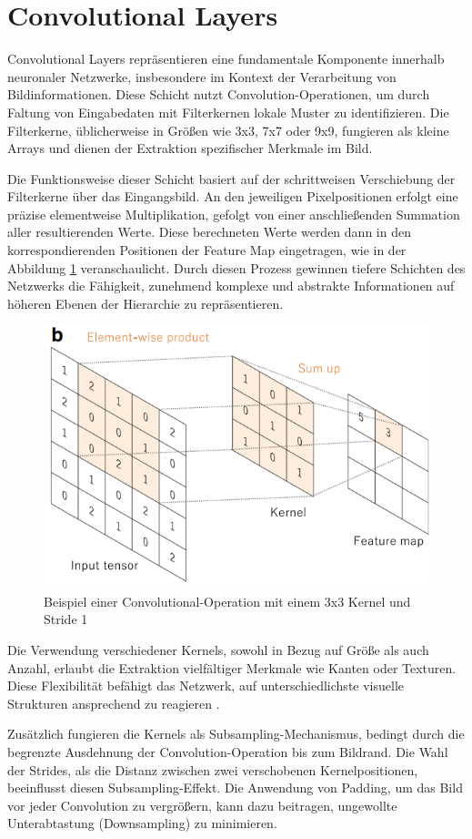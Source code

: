 \section{Convolutional Layers}
Convolutional Layers repräsentieren eine fundamentale Komponente innerhalb neuronaler Netzwerke, insbesondere im Kontext der Verarbeitung von Bildinformationen. Diese Schicht nutzt Convolution-Operationen, um durch Faltung von Eingabedaten mit Filterkernen lokale Muster zu identifizieren. Die Filterkerne, üblicherweise in Größen wie 3x3, 7x7 oder 9x9, fungieren als kleine Arrays und dienen der Extraktion spezifischer Merkmale im Bild.

Die Funktionsweise dieser Schicht basiert auf der schrittweisen Verschiebung der Filterkerne über das Eingangsbild. An den jeweiligen Pixelpositionen erfolgt eine präzise elementweise Multiplikation, gefolgt von einer anschließenden Summation aller resultierenden Werte. Diese berechneten Werte werden dann in den korrespondierenden Positionen der Feature Map eingetragen, wie in der Abbildung \ref{fig:convolutionalLayer} veranschaulicht. Durch diesen Prozess gewinnen tiefere Schichten des Netzwerks die Fähigkeit, zunehmend komplexe und abstrakte Informationen auf höheren Ebenen der Hierarchie zu repräsentieren.

\begin{figure}[ht]
	\centering
	\includegraphics[width=0.5\linewidth]{./images/convolutionalLayer.png}
	\caption{Beispiel einer Convolutional-Operation mit einem 3x3 Kernel und Stride 1\cite{Yamashita.2018}}
	\label{fig:convolutionalLayer}
\end{figure}

Die Verwendung verschiedener Kernels, sowohl in Bezug auf Größe als auch Anzahl, erlaubt die Extraktion vielfältiger Merkmale wie Kanten oder Texturen. Diese Flexibilität befähigt das Netzwerk, auf unterschiedlichste visuelle Strukturen ansprechend zu reagieren \cite{Yamashita.2018}.

Zusätzlich fungieren die Kernels als Subsampling-Mechanismus, bedingt durch die begrenzte Ausdehnung der Convolution-Operation bis zum Bildrand. Die Wahl der Strides, als die Distanz zwischen zwei verschobenen Kernelpositionen, beeinflusst diesen Subsampling-Effekt. Die Anwendung von Padding, um das Bild vor jeder Convolution zu vergrößern, kann dazu beitragen, ungewollte Unterabtastung (Downsampling) zu minimieren.

